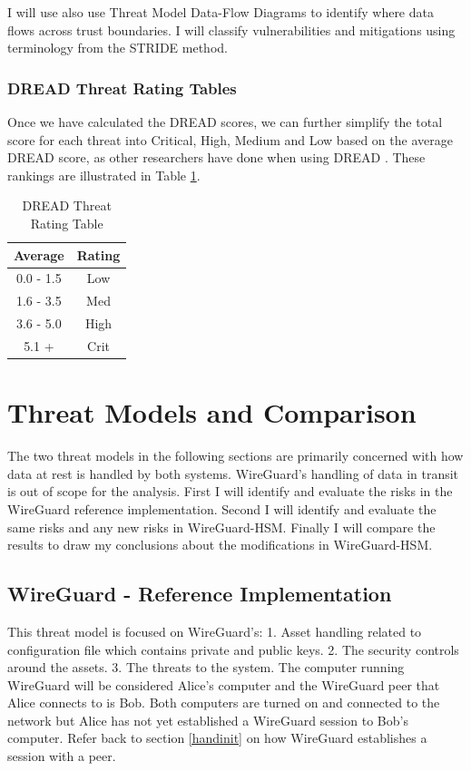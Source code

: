 \documentclass [11pt, proquest] {uwthesis}[2020/02/24]
\begin{document}
I will use also use Threat Model Data-Flow Diagrams to identify where data flows across trust boundaries.
I will classify vulnerabilities and mitigations using terminology from the STRIDE method\cite{hernan_uncover_2019}.

\subsection{DREAD Threat Rating Tables}
Once we have calculated the DREAD scores, we can further simplify the total score for each threat into Critical, High, Medium and Low based on the average DREAD score, as other researchers have done when using DREAD \cite{kaur_critical_2017}. These rankings are illustrated in Table \ref{DREAD:rating}.

\begin{flushleft}
\begin{table}[H]
\begin{center}
\begin{tabular}{ |c|c| } 
\hline
Average & Rating \\
\hline
0.0 - 1.5 & Low \\
\hline
1.6 - 3.5 & Med \\ 
\hline
3.6 - 5.0 & High \\ 
\hline
5.1 + & Crit \\ 
\hline
\end{tabular}
\caption{DREAD Threat Rating Table}
\label{DREAD:rating}
\end{center}
\end{table}
\end{flushleft}

\chapter {Threat Models and Comparison}
The two threat models in the following sections are primarily concerned with how data at rest is handled by both systems. WireGuard's handling of data in transit is out of scope for the analysis.
First I will identify and evaluate the risks in the WireGuard reference implementation. Second I will identify and evaluate the same risks and any new risks in WireGuard-HSM. Finally I will compare the results to draw my conclusions about the modifications in WireGuard-HSM.

\section {WireGuard - Reference Implementation}
\label{wg-ref-analysis}
This threat model is focused on WireGuard's: 1. Asset handling related to configuration file which contains private and public keys. 2. The security controls around the assets. 3. The threats to the system. 
The computer running WireGuard will be considered Alice's computer and the WireGuard peer that Alice connects to is Bob. Both computers are turned on and connected to the network but Alice has not yet established a WireGuard session to Bob's computer. Refer back to section \ref{handinit} on how WireGuard establishes a session with a peer. 
\end{document}
